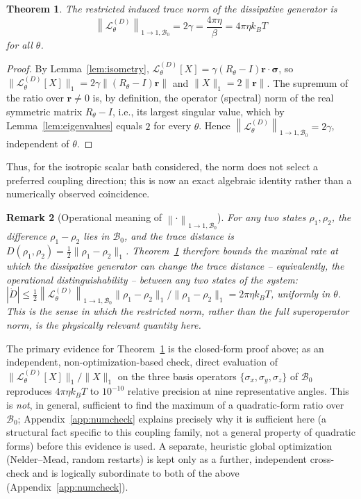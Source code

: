 \documentclass[aps,pra,reprint,superscriptaddress,nofootinbib,longbibliography]{revtex4-2}
\newtheorem{theorem}{Theorem}[section]
\newtheorem{remark}[theorem]{Remark}
\newcommand{\Bzero}{\mathcal{B}_0}
\newcommand{\supnorm}[1]{\left\|#1\right\|_{1\rightarrow1,\Bzero}}
\begin{document}
\begin{theorem}
\label{thm:norm}
The restricted induced trace norm of the dissipative generator is
\begin{equation}
\boxed{\supnorm{\mathcal{L}^{(D)}_\theta}=2\gamma=\frac{4\pi\eta}{\beta}=4\pi\eta k_BT}
\end{equation}
for all $\theta$.
\end{theorem}
\begin{proof}
By Lemma~\ref{lem:isometry}, $\mathcal L^{(D)}_\theta[X]=\gamma(R_\theta-I)\mathbf r\cdot\boldsymbol\sigma$,
so $\|\mathcal L^{(D)}_\theta[X]\|_1=2\gamma\|(R_\theta-I)\mathbf r\|$
and $\|X\|_1=2\|\mathbf r\|$. The supremum of the ratio over
$\mathbf r\neq0$ is, by definition, the operator (spectral) norm of
the real symmetric matrix $R_\theta-I$, i.e., its largest singular
value, which by Lemma~\ref{lem:eigenvalues} equals $2$ for every
$\theta$. Hence $\supnorm{\mathcal L^{(D)}_\theta}=2\gamma$,
independent of $\theta$.
\end{proof}
Thus, for the isotropic scalar bath considered, the norm does not
select a preferred coupling direction; this is now an exact algebraic
identity rather than a numerically observed coincidence.

\begin{remark}[Operational meaning of $\supnorm{\cdot}$]
For any two states $\rho_1,\rho_2$, the difference $\rho_1-\rho_2$
lies in $\mathcal B_0$, and the trace distance is
$D(\rho_1,\rho_2)=\tfrac12\|\rho_1-\rho_2\|_1$. Theorem~\ref{thm:norm}
therefore bounds the maximal rate at which the dissipative generator
can change the trace distance -- equivalently, the operational
distinguishability -- between \emph{any} two states of the system:
$|\dot D|\le\tfrac12\supnorm{\mathcal L^{(D)}_\theta}\|\rho_1-\rho_2\|_1/\|\rho_1-\rho_2\|_1
=2\pi\eta k_BT$, uniformly in $\theta$. This is the sense in which the
restricted norm, rather than the full superoperator norm, is the
physically relevant quantity here.
\end{remark}

The primary evidence for Theorem~\ref{thm:norm} is the closed-form
proof above; as an independent, non-optimization-based check, direct
evaluation of $\|\mathcal L^{(D)}_\theta[X]\|_1/\|X\|_1$ on the three
basis operators $\{\sigma_x,\sigma_y,\sigma_z\}$ of $\mathcal B_0$
reproduces $4\pi\eta k_BT$ to $10^{-10}$ relative precision at nine
representative angles. This is \emph{not}, in general, sufficient to
find the maximum of a quadratic-form ratio over $\mathcal B_0$;
Appendix~\ref{app:numcheck} explains precisely why it is sufficient
here (a structural fact specific to this coupling family, not a
general property of quadratic forms) before this evidence is used. A
separate, heuristic global optimization (Nelder--Mead, random
restarts) is kept only as a further, independent cross-check and is
logically subordinate to both of the above (Appendix~\ref{app:numcheck}).
\end{document}
